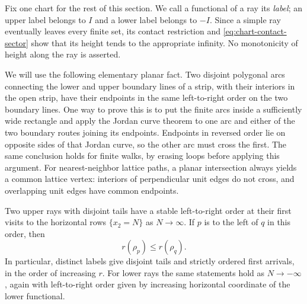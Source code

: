Fix one chart for the rest of this section.  We call a functional of a ray
its \emph{label}; an upper label belongs to $I$ and a lower label belongs to
$-I$.  Since a simple ray eventually leaves every finite set, its contact
restriction and \eqref{eq:chart-contact-sector} show that its height tends
to the appropriate infinity.  No monotonicity of height along the ray is
asserted.

We will use the following elementary planar fact.  Two disjoint polygonal
arcs connecting the lower and upper boundary lines of a strip, with their
interiors in the open strip, have their endpoints in the same left-to-right
order on the two boundary lines.  One way to prove this is to put the
finite arcs inside a sufficiently wide rectangle and apply the Jordan
curve theorem to one arc and either of the two boundary routes joining
its endpoints.  Endpoints in reversed order lie on opposite sides of that
Jordan curve, so the other arc must cross the first.  The same conclusion
holds for finite walks, by erasing loops before applying this argument.
For nearest-neighbor lattice paths, a planar intersection always yields a
common lattice vertex: interiors of perpendicular unit edges do not cross,
and overlapping unit edges have common endpoints.

\begin{lemma}\label{lem:ray-order}
Two upper rays with disjoint tails have a stable left-to-right order at
their first visits to the horizontal rows $\{x_2=N\}$ as $N\to\infty$.
If $p$ is to the left of $q$ in this order, then
\begin{equation}\label{eq:ray-order}
 r(\rho_p)\leq r(\rho_q).
\end{equation}
In particular, distinct labels give disjoint tails and strictly ordered
first arrivals, in the order of increasing $r$.  For lower rays the same
statements hold as $N\to-\infty$, again with left-to-right order given by
increasing horizontal coordinate of the lower functional.
\end{lemma}

